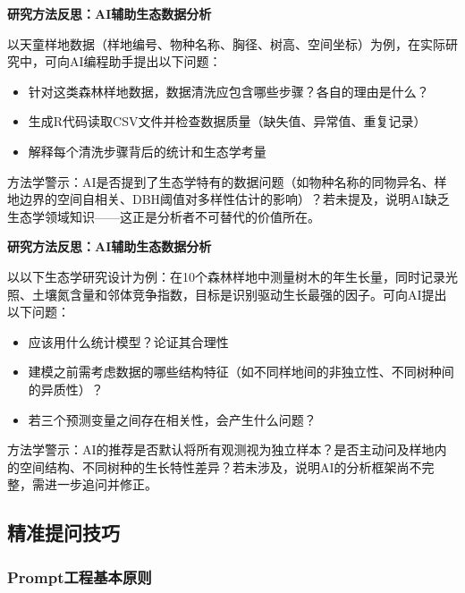 \documentclass[
  twoside,12pt,fontset=none]{ctexbook}
\providecommand{\tightlist}{%
  \setlength{\itemsep}{0pt}\setlength{\parskip}{0pt}}
\renewenvironment{quote}{%
  \def\FrameCommand{{\color{quote-border}\vrule width 4pt}\hspace{10pt}}%
  \MakeFramed {\advance\hsize-\width \FrameRestore\noindent\ignorespaces}%
}{%
  \endMakeFramed
}
\begin{document}
\begin{quote}
\textbf{研究方法反思：AI辅助生态数据分析}

以天童样地数据（样地编号、物种名称、胸径、树高、空间坐标）为例，在实际研究中，可向AI编程助手提出以下问题：

\begin{itemize}
\tightlist
\item
  针对这类森林样地数据，数据清洗应包含哪些步骤？各自的理由是什么？
\item
  生成R代码读取CSV文件并检查数据质量（缺失值、异常值、重复记录）
\item
  解释每个清洗步骤背后的统计和生态学考量
\end{itemize}

方法学警示：AI是否提到了生态学特有的数据问题（如物种名称的同物异名、样地边界的空间自相关、DBH阈值对多样性估计的影响）？若未提及，说明AI缺乏生态学领域知识------这正是分析者不可替代的价值所在。

\textbf{研究方法反思：AI辅助生态数据分析}

以以下生态学研究设计为例：在10个森林样地中测量树木的年生长量，同时记录光照、土壤氮含量和邻体竞争指数，目标是识别驱动生长最强的因子。可向AI提出以下问题：

\begin{itemize}
\tightlist
\item
  应该用什么统计模型？论证其合理性
\item
  建模之前需考虑数据的哪些结构特征（如不同样地间的非独立性、不同树种间的异质性）？
\item
  若三个预测变量之间存在相关性，会产生什么问题？
\end{itemize}

方法学警示：AI的推荐是否默认将所有观测视为独立样本？是否主动问及样地内的空间结构、不同树种的生长特性差异？若未涉及，说明AI的分析框架尚不完整，需进一步追问并修正。
\end{quote}

\hypertarget{ux7cbeux51c6ux63d0ux95eeux6280ux5de7}{%
\subsection{精准提问技巧}\label{ux7cbeux51c6ux63d0ux95eeux6280ux5de7}}

\hypertarget{promptux5de5ux7a0bux57faux672cux539fux5219}{%
\subsubsection{Prompt工程基本原则}\label{promptux5de5ux7a0bux57faux672cux539fux5219}}
\end{document}
